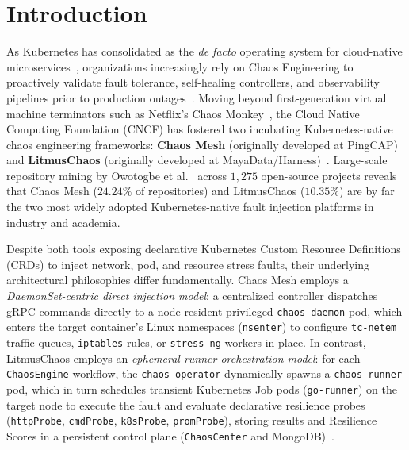 \section{Introduction}
\label{sec:introduction}

As Kubernetes has consolidated as the \textit{de facto} operating system for cloud-native microservices~\cite{gannon_2017, kosinska_2023}, organizations increasingly rely on Chaos Engineering to proactively validate fault tolerance, self-healing controllers, and observability pipelines prior to production outages~\cite{basiri_2016, owotogbe2026tenyears}. Moving beyond first-generation virtual machine terminators such as Netflix's Chaos Monkey~\cite{basiri_2016}, the Cloud Native Computing Foundation (CNCF) has fostered two incubating Kubernetes-native chaos engineering frameworks: \textbf{Chaos Mesh} (originally developed at PingCAP) and \textbf{LitmusChaos} (originally developed at MayaData/Harness)~\cite{owotogbe2026tenyears, onkalo2025improving}. Large-scale repository mining by Owotogbe et al.~\cite{owotogbe2026chaos} across $1{,}275$ open-source projects reveals that Chaos Mesh ($24.24\%$ of repositories) and LitmusChaos ($10.35\%$) are by far the two most widely adopted Kubernetes-native fault injection platforms in industry and academia.

Despite both tools exposing declarative Kubernetes Custom Resource Definitions (CRDs) to inject network, pod, and resource stress faults, their underlying architectural philosophies differ fundamentally. Chaos Mesh employs a \textit{DaemonSet-centric direct injection model}: a centralized controller dispatches gRPC commands directly to a node-resident privileged \texttt{chaos-daemon} pod, which enters the target container's Linux namespaces (\texttt{nsenter}) to configure \texttt{tc-netem} traffic queues, \texttt{iptables} rules, or \texttt{stress-ng} workers in place. In contrast, LitmusChaos employs an \textit{ephemeral runner orchestration model}: for each \texttt{ChaosEngine} workflow, the \texttt{chaos-operator} dynamically spawns a \texttt{chaos-runner} pod, which in turn schedules transient Kubernetes Job pods (\texttt{go-runner}) on the target node to execute the fault and evaluate declarative resilience probes (\texttt{httpProbe}, \texttt{cmdProbe}, \texttt{k8sProbe}, \texttt{promProbe}), storing results and Resilience Scores in a persistent control plane (\texttt{ChaosCenter} and MongoDB)~\cite{onkalo2025improving, opara2025chaos}.

